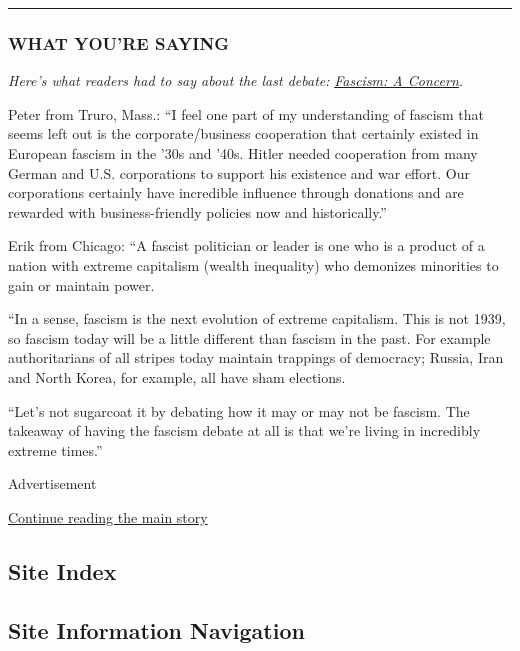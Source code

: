 \begin{center}\rule{0.5\linewidth}{\linethickness}\end{center}

\hypertarget{what-youre-saying}{%
\subsubsection{WHAT YOU'RE SAYING}\label{what-youre-saying}}

\emph{Here's what readers had to say about the last debate:}
\href{https://www.nytimes3xbfgragh.onion/2020/07/30/opinion/fascism-us.html}{\emph{Fascism:
A Concern}}\emph{.}

Peter from Truro, Mass.: ``I feel one part of my understanding of
fascism that seems left out is the corporate/business cooperation that
certainly existed in European fascism in the '30s and '40s. Hitler
needed cooperation from many German and U.S. corporations to support his
existence and war effort. Our corporations certainly have incredible
influence through donations and are rewarded with business-friendly
policies now and historically.''

Erik from Chicago: ``A fascist politician or leader is one who is a
product of a nation with extreme capitalism (wealth inequality) who
demonizes minorities to gain or maintain power.

``In a sense, fascism is the next evolution of extreme capitalism. This
is not 1939, so fascism today will be a little different than fascism in
the past. For example authoritarians of all stripes today maintain
trappings of democracy; Russia, Iran and North Korea, for example, all
have sham elections.

``Let's not sugarcoat it by debating how it may or may not be fascism.
The takeaway of having the fascism debate at all is that we're living in
incredibly extreme times.''

Advertisement

\protect\hyperlink{after-bottom}{Continue reading the main story}

\hypertarget{site-index}{%
\subsection{Site Index}\label{site-index}}

\hypertarget{site-information-navigation}{%
\subsection{Site Information
Navigation}\label{site-information-navigation}}

